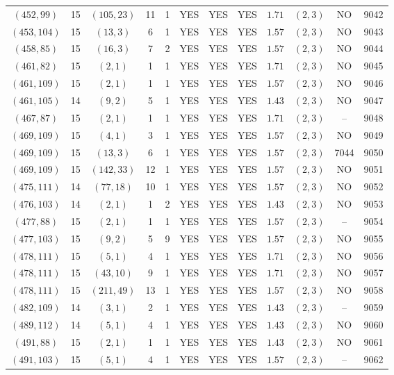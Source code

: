 \begin{longtable}{|c|c|c|c|c|c|c|c|c|c|c|c|}
$(452,99)$ & 15 & $(105,23)$ & 11 & 1 & YES & YES & YES & $1.71$ & $(2,3)$ & NO & 9042\\
$(453,104)$ & 15 & $(13,3)$ & 6 & 1 & YES & YES & YES & $1.57$ & $(2,3)$ & NO & 9043\\
$(458,85)$ & 15 & $(16,3)$ & 7 & 2 & YES & YES & YES & $1.57$ & $(2,3)$ & NO & 9044\\
$(461,82)$ & 15 & $(2,1)$ & 1 & 1 & YES & YES & YES & $1.71$ & $(2,3)$ & NO & 9045\\
$(461,109)$ & 15 & $(2,1)$ & 1 & 1 & YES & YES & YES & $1.57$ & $(2,3)$ & NO & 9046\\
$(461,105)$ & 14 & $(9,2)$ & 5 & 1 & YES & YES & YES & $1.43$ & $(2,3)$ & NO & 9047\\
$(467,87)$ & 15 & $(2,1)$ & 1 & 1 & YES & YES & YES & $1.71$ & $(2,3)$ & -- & 9048\\
$(469,109)$ & 15 & $(4,1)$ & 3 & 1 & YES & YES & YES & $1.57$ & $(2,3)$ & NO & 9049\\
$(469,109)$ & 15 & $(13,3)$ & 6 & 1 & YES & YES & YES & $1.57$ & $(2,3)$ & 7044 & 9050\\
$(469,109)$ & 15 & $(142,33)$ & 12 & 1 & YES & YES & YES & $1.57$ & $(2,3)$ & NO & 9051\\
$(475,111)$ & 14 & $(77,18)$ & 10 & 1 & YES & YES & YES & $1.57$ & $(2,3)$ & NO & 9052\\
$(476,103)$ & 14 & $(2,1)$ & 1 & 2 & YES & YES & YES & $1.43$ & $(2,3)$ & NO & 9053\\
$(477,88)$ & 15 & $(2,1)$ & 1 & 1 & YES & YES & YES & $1.57$ & $(2,3)$ & -- & 9054\\
$(477,103)$ & 15 & $(9,2)$ & 5 & 9 & YES & YES & YES & $1.57$ & $(2,3)$ & NO & 9055\\
$(478,111)$ & 15 & $(5,1)$ & 4 & 1 & YES & YES & YES & $1.71$ & $(2,3)$ & NO & 9056\\
$(478,111)$ & 15 & $(43,10)$ & 9 & 1 & YES & YES & YES & $1.71$ & $(2,3)$ & NO & 9057\\
$(478,111)$ & 15 & $(211,49)$ & 13 & 1 & YES & YES & YES & $1.57$ & $(2,3)$ & NO & 9058\\
$(482,109)$ & 14 & $(3,1)$ & 2 & 1 & YES & YES & YES & $1.43$ & $(2,3)$ & -- & 9059\\
$(489,112)$ & 14 & $(5,1)$ & 4 & 1 & YES & YES & YES & $1.43$ & $(2,3)$ & NO & 9060\\
$(491,88)$ & 15 & $(2,1)$ & 1 & 1 & YES & YES & YES & $1.43$ & $(2,3)$ & NO & 9061\\
$(491,103)$ & 15 & $(5,1)$ & 4 & 1 & YES & YES & YES & $1.57$ & $(2,3)$ & -- & 9062\\

\end{longtable}
